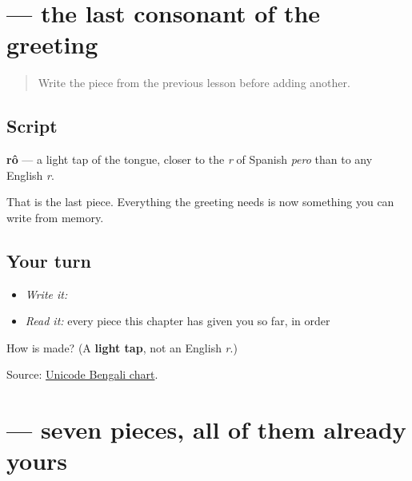 \section[\texorpdfstring{\bn{র} (rô)}{র (rô)}]{ — the last consonant of the greeting}

\label{lesson:BN-W01-ra}



\begin{quote}
Write the piece from the previous lesson before adding another.
\end{quote}

\subsection*{Script}

\begin{quote}
\end{quote}

\textbf{rô} — a light tap of the tongue, closer to the \emph{r} of Spanish \emph{pero} than to any English \emph{r}.

That is the last piece. Everything the greeting needs is now something you can write from memory.

\subsection*{Your turn}
\begin{itemize}
\raggedright
  \item \emph{Write it:} 
  \item \emph{Read it:} every piece this chapter has given you so far, in order
\end{itemize}

\begin{tcolorbox}[breakable,colback=teal!4,colframe=teal!35!black,title={Before you move on}]
How is \textbf{} made? (A \textbf{light tap}, not an English \emph{r}.)

Source: \href{https://www.unicode.org/charts/PDF/U0980.pdf}{Unicode Bengali chart}.
\end{tcolorbox}
\section[\texorpdfstring{\bn{নমস্কার} (nomoshkar)}{নমস্কার (nomoshkar)}]{ — seven pieces, all of them already yours}

